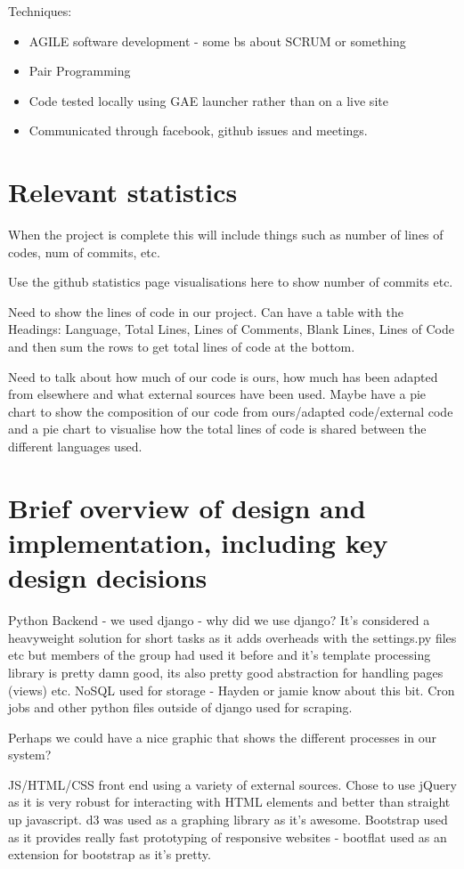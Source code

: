 \documentclass[12pt, a4paper]{article}
\begin{document}
Techniques:
\begin{itemize}
\item AGILE software development - some bs about SCRUM or something
\item Pair Programming
\item Code tested locally using GAE launcher rather than on a live site
\item Communicated through facebook, github issues and meetings.
\end{itemize}

\newpage
\section{Relevant statistics}

When the project is complete this will include things such as number of lines of codes, num of commits, etc.

Use the github statistics page visualisations here to show number of commits etc.

Need to show the lines of code in our project. Can have a table with the Headings: Language, Total Lines, Lines of Comments, Blank Lines, Lines of Code and then sum the rows to get total lines of code at the bottom.

Need to talk about how much of our code is ours, how much has been adapted from elsewhere and what external sources have been used. Maybe have a pie chart to show the composition of our code from ours/adapted code/external code and a pie chart to visualise how the total lines of code is shared between the different languages used.


\newpage
\section{Brief overview of design and implementation, including key design decisions}
Python Backend - we used django - why did we use django? It's considered a heavyweight solution for short tasks as it adds overheads with the settings.py files etc but members of the group had used it before and it's template processing library is pretty damn good, its also pretty good abstraction for handling pages (views) etc. NoSQL used for storage - Hayden or jamie know about this bit. Cron jobs and other python files outside of django used for scraping. 

Perhaps we could have a nice graphic that shows the different processes in our system?

JS/HTML/CSS front end using a variety of external sources. Chose to use jQuery as it is very robust for interacting with HTML elements and better than straight up javascript. d3 was used as a graphing library as it's awesome. Bootstrap used as it provides really fast prototyping of responsive websites - bootflat used as an extension for bootstrap as it's pretty.
\end{document}
